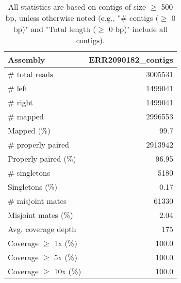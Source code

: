 \documentclass[12pt,a4paper]{article}
\begin{document}
\begin{table}[ht]
\begin{center}
\caption{All statistics are based on contigs of size $\geq$ 500 bp, unless otherwise noted (e.g., "\# contigs ($\geq$ 0 bp)" and "Total length ($\geq$ 0 bp)" include all contigs).}
\begin{tabular}{|l*{1}{|r}|}
\hline
Assembly & ERR2090182\_contigs \\ \hline
\# total reads & 3005531 \\ \hline
\# left & 1499041 \\ \hline
\# right & 1499041 \\ \hline
\# mapped & 2996553 \\ \hline
Mapped (\%) & 99.7 \\ \hline
\# properly paired & 2913942 \\ \hline
Properly paired (\%) & 96.95 \\ \hline
\# singletons & 5180 \\ \hline
Singletons (\%) & 0.17 \\ \hline
\# misjoint mates & 61330 \\ \hline
Misjoint mates (\%) & 2.04 \\ \hline
Avg. coverage depth & 175 \\ \hline
Coverage $\geq$ 1x (\%) & 100.0 \\ \hline
Coverage $\geq$ 5x (\%) & 100.0 \\ \hline
Coverage $\geq$ 10x (\%) & 100.0 \\ \hline
\end{tabular}
\end{center}
\end{table}
\end{document}
